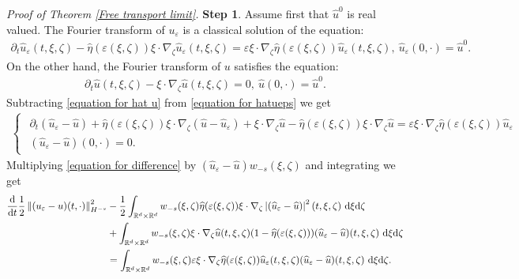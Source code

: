 \documentclass[11pt,reqno]{amsart}
\numberwithin{equation}{section}
\def\dd{{\rm d}}
\begin{document}
\textit{Proof of Theorem \ref{Free transport limit}.} 
\textbf{Step 1}. Assume first  that $\widehat{u
}^{0}$ is real valued. The Fourier transform of $u_{\varepsilon}$ is a classical solution of the equation:
\begin{align}
\partial_{t}\widehat u_{\varepsilon}(t,\xi,\zeta)-\widehat{\eta}(\varepsilon(\xi,\zeta))\xi\cdot \nabla_{\zeta}\widehat u_{\varepsilon}(t,\xi,\zeta)=\varepsilon \xi \cdot\nabla_{\zeta}\widehat{\eta}(\varepsilon(\xi,\zeta))\widehat u_{\varepsilon}(t,\xi,\zeta),\ \widehat{u}_{\varepsilon}(0,\cdot)=\widehat{u}^{0} .  \label{equation for hatueps}
\end{align}
On the other hand, the Fourier transform of $u$ satisfies the equation:  
\begin{align}
\partial_{t}\widehat{u}(t,\xi,\zeta)-\xi\cdot \nabla_{\zeta}\widehat{u}(t,\xi,\zeta)=0, \ \widehat{u}(0,\cdot)=\widehat{u}^{0}.\label{equation for hat u}
\end{align}
Subtracting \eqref{equation for hat u} from  \eqref{equation for hatueps} we get 
\begin{align}
\begin{cases}
\begin{array}{lc}
\partial_{t}(\widehat{u}_{\varepsilon}-\widehat{u})+\widehat{\eta}(\varepsilon(\xi,\zeta))\xi \cdot \nabla_{\zeta}(\widehat{u}-\widehat{u}_{\varepsilon})+\xi\cdot \nabla_{\zeta}\widehat{u}-\widehat{\eta}(\varepsilon(\xi,\zeta))\xi\cdot \nabla_{\zeta}\widehat{u} =\varepsilon\xi \cdot \nabla_{\zeta}\widehat{\eta}(\varepsilon(\xi,\zeta))\widehat{u}_{\varepsilon}\\
(\widehat{u}_{\varepsilon}-\widehat{u})(0,\cdot)=0. 
\end{array}
\end{cases}
\label{equation for difference}
\end{align}
Multiplying \eqref{equation for difference} by $(\widehat{u}_{\varepsilon}-\widehat{u})w_{-s}(\xi,\zeta)$ and integrating we get 
\begin{align*}
\frac{\dd}{\dd t}\frac{1}{2}\left\Vert (u_{\varepsilon}-u)(t,\cdot)\right\Vert_{H^{-s}}^{2}&-\frac{1}{2}\int_{\mathbb{R}^{d}\times \mathbb{R}^{d}}w_{-s}(\xi,\zeta)\widehat{\eta}(\varepsilon(\xi,\zeta))\xi\cdot \nabla_{\zeta}\left\vert (\widehat{u}_{\varepsilon}-\widehat{u})\right\vert^{2}(t,\xi,\zeta)\ \dd \xi\dd \zeta\\
&+\int_{\mathbb{R}^{d}\times \mathbb{R}^{d}}w_{-s}(\xi,\zeta)\xi \cdot \nabla_{\zeta}\widehat{u}(t,\xi,\zeta)(1-\widehat{\eta}(\varepsilon(\xi,\zeta)))(\widehat{u}_{\varepsilon}-\widehat{u})(t,\xi,\zeta)\ \dd \xi\dd \zeta\\
&=\int_{\mathbb{R}^{d}\times \mathbb{R}^{d}}w_{-s}(\xi,\zeta)\varepsilon \xi\cdot \nabla_{\zeta}\widehat{\eta}(\varepsilon(\xi,\zeta))\widehat{u}_{\varepsilon}(t,\xi,\zeta)(\widehat{u}_{\varepsilon}-\widehat{u})(t,\xi,\zeta)\ \dd \xi \dd \zeta. 
\end{align*}
\end{document}
